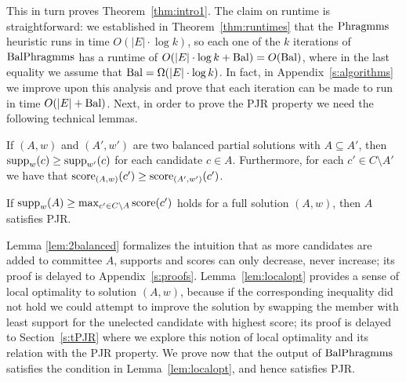 This in turn proves Theorem~\ref{thm:intro1}. 
The claim on runtime is straightforward: we established in Theorem~\ref{thm:runtimes} that the $\operatorname{Phragmms}$ heuristic runs in time $O(|E|\cdot \log k)$, so each one of the $k$ iterations of $\operatorname{BalPhragmms}$ has a runtime of $O(|E|\cdot \log k + \operatorname{Bal})=O(\operatorname{Bal})$, where in the last equality we assume that $\operatorname{Bal}= \Omega(|E|\cdot \log k)$. 
In fact, in Appendix~\ref{s:algorithms} we improve upon this analysis and prove that each iteration can be made to run in time $O(|E| + \operatorname{Bal})$.
Next, in order to prove the PJR property we need the following technical lemmas.

\begin{lemma}\label{lem:2balanced}
If $(A,w)$ and $(A',w')$ are two balanced partial solutions with $A\subseteq A'$, then $\operatorname{supp}_w(c)\geq \operatorname{supp}_{w'}(c)$ for each candidate $c\in A$. 
Furthermore, for each $c'\in C\setminus A'$ we have that $\operatorname{score}_{(A,w)}(c')\geq \operatorname{score}_{(A',w')}(c')$.
\end{lemma}

\begin{lemma}\label{lem:localopt}
If $\operatorname{supp}_w(A)\geq \max_{c'\in C\setminus A} \operatorname{score}(c')$ holds for a full solution $(A,w)$, then $A$ satisfies PJR.
\end{lemma}

Lemma \ref{lem:2balanced} formalizes the intuition that as more candidates are added to committee $A$, supports and scores can only decrease, never increase; its proof is delayed to Appendix~\ref{s:proofs}.
Lemma~\ref{lem:localopt} provides a sense of local optimality to solution $(A,w)$, because if the corresponding inequality did not hold we could attempt to improve the solution by swapping the member with least support for the unelected candidate with highest score; its proof is delayed to Section~\ref{s:tPJR} where we explore this notion of local optimality and its relation with the PJR property. 
We prove now that the output of $\operatorname{BalPhragmms}$ satisfies the condition in Lemma~\ref{lem:localopt}, and hence satisfies PJR.

